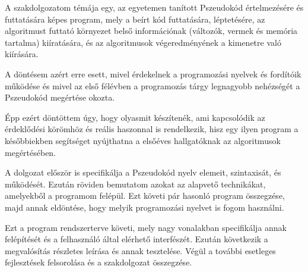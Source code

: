 A szakdolgozatom témája egy, az egyetemen tanított Pszeudokód\cite{jegyzet}\cite{jegyzet2} értelmezésére és futtatására képes program, mely a beírt kód futtatására, léptetésére, az algoritmust futtató környezet belső információnak (változók, vermek és memória tartalma) kiíratására, és az algoritmusok végeredményének a kimenetre való kiírására.

A döntésem azért erre esett, mivel érdekelnek a programozási nyelvek és fordítóik működése és mivel az első félévben a programozás tárgy legnagyobb nehézségét a Pszeudokód megértése okozta.

Épp ezért döntöttem úgy, hogy olyasmit készítenék, ami kapcsolódik az érdeklődési körömhöz és reális haszonnal is rendelkezik, hisz egy ilyen program a későbbiekben segítséget nyújthatna a elsőéves hallgatóknak az algoritmusok megértésében.

A dolgozat először is specifikálja a Pszeudokód nyelv elemeit, szintaxisát, és működését. Ezután röviden bemutatom azokat az alapvető technikákat, amelyekből a programom felépül. Ezt követi pár hasonló program összegzése, majd annak eldöntése, hogy melyik programozási nyelvet is fogom használni.

Ezt a program rendszerterve követi, mely nagy vonalakban specifikálja annak felépítését és a felhasználó által elérhető interfészét. Ezután következik a megvalósítás részletes leírása és annak tesztelése. Végül a további esetleges fejlesztések felsorolása és a szakdolgozat összegzése.